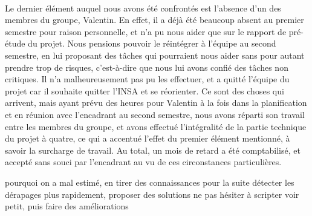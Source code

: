 \paragraph{}
Le dernier élément auquel nous avons été confrontés est l'absence d'un des membres du groupe, Valentin. En effet, il a déjà été beaucoup absent au premier semestre pour raison personnelle, et n'a pu nous aider que sur le rapport de pré-étude du projet. Nous pensions pouvoir le réintégrer à l'équipe au second semestre, en lui proposant des tâches qui pourraient nous aider sans pour autant prendre trop de risques, c'est-à-dire que nous lui avons confié des tâches non critiques. Il n'a malheureusement pas pu les effectuer, et a quitté l'équipe du projet car il souhaite quitter l'INSA et se réorienter. Ce sont des choses qui arrivent, mais ayant prévu des heures pour Valentin à la fois dans la planification et en réunion avec l'encadrant au second semestre, nous avons réparti son travail entre les membres du groupe, et avons effectué l'intégralité de la partie technique du projet à quatre, ce qui a accentué l'effet du premier élément mentionné, à savoir la surcharge de travail. Au total, un mois de retard a été comptabilisé, et accepté sans souci par l'encadrant au vu de ces circonstances particulières.


pourquoi on a mal estimé, en tirer des connaissances pour la suite
détecter les dérapages plus rapidement, proposer des solutions
ne pas hésiter à scripter
voir petit, puis faire des améliorations

